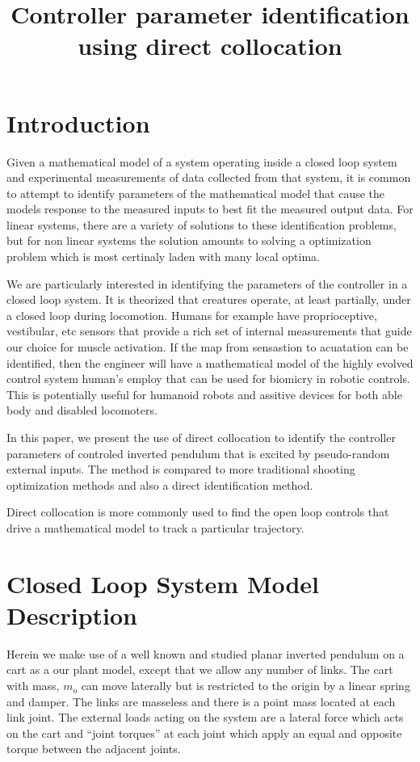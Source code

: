 \documentclass{article}
\title{Controller parameter identification using direct collocation}
\begin{document}
\maketitle

\section{Introduction}

Given a mathematical model of a system operating inside a closed loop system
and experimental measurements of data collected from that system, it is common
to attempt to identify parameters of the mathematical model that cause the
models response to the measured inputs to best fit the measured output data.
For linear systems, there are a variety of solutions to these identification
problems, but for non linear systems the solution amounts to solving a
optimization problem which is most certinaly laden with many local optima.

We are particularly interested in identifying the parameters of the controller
in a closed loop system. It is theorized that creatures operate, at least
partially, under a closed loop during locomotion. Humans for example have
proprioceptive, vestibular, etc sensors that provide a rich set of internal
measurements that guide our choice for muscle activation. If the map from
sensastion to acuatation can be identified, then the engineer will have a
mathematical model of the highly evolved control system human's employ that can
be used for biomicry in robotic controls. This is potentially useful for
humanoid robots and assitive devices for both able body and disabled
locomoters.

In this paper, we present the use of direct collocation to identify the
controller parameters of controled inverted pendulum that is excited by
pseudo-random external inputs. The method is compared to more traditional
shooting optimization methods and also a direct identification method.

Direct collocation is more commonly used to find the open loop controls that
drive a mathematical model to track a particular trajectory.

\section{Closed Loop System Model Description}

Herein we make use of a well known and studied planar inverted pendulum on a
cart as a our plant model, except that we allow any number of links. The cart
with mass, $m_o$ can move laterally but is restricted to the origin by a linear
spring and damper. The links are masseless and there is a point mass located at
each link joint. The external loads acting on the system are a lateral force
which acts on the cart and ``joint torques'' at each joint which apply an equal
and opposite torque between the adjacent joints.
\end{document}
